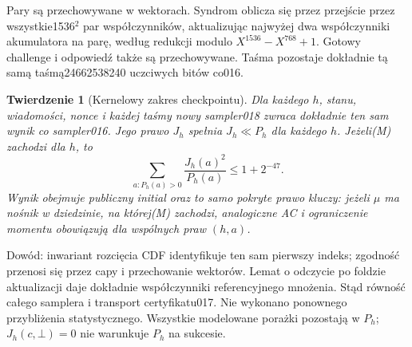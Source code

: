 \documentclass[11pt,a4paper]{article}
\newtheorem{theorem}{Twierdzenie}
\begin{document}
Pary są przechowywane w wektorach. Syndrom oblicza się przez przejście
przez wszystkie1536$^2$ par współczynników, aktualizując najwyżej dwa
współczynniki akumulatora na parę, według redukcji modulo
$X^{1536}-X^{768}+1$. Gotowy challenge i odpowiedź także są przechowywane.
Taśma pozostaje dokładnie tą samą taśmą24662538240 uczciwych bitów co016.

\begin{theorem}[Kernelowy zakres checkpointu]
Dla każdego $h$, stanu, wiadomości, nonce i każdej taśmy nowy sampler018
zwraca dokładnie ten sam wynik co sampler016. Jego prawo $J_h$ spełnia
$J_h\ll P_h$ dla każdego $h$. Jeżeli(M) zachodzi dla $h$, to
\[
 \sum_{a:P_h(a)>0}\frac{J_h(a)^2}{P_h(a)}\le 1+2^{-47}.
\]
Wynik obejmuje publiczny initial oraz to samo pokryte prawo kluczy:
jeżeli $\mu$ ma nośnik w dziedzinie, na której(M) zachodzi, analogiczne
AC i ograniczenie momentu obowiązują dla wspólnych praw $(h,a)$.
\end{theorem}
Dowód: inwariant rozcięcia CDF identyfikuje ten sam pierwszy indeks;
zgodność przenosi się przez capy i przechowanie wektorów. Lemat o odczycie
po foldzie aktualizacji daje dokładnie współczynniki referencyjnego
mnożenia. Stąd równość całego samplera i transport certyfikatu017.
Nie wykonano ponownego przybliżenia statystycznego. Wszystkie modelowane
porażki pozostają w $P_h$; $J_h(c,\bot)=0$ nie warunkuje $P_h$ na sukcesie.
\end{document}

